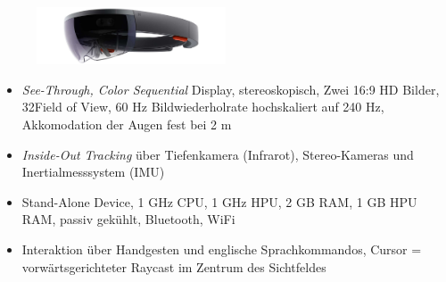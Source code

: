 \begin{frame}[fragile]{}
\begin{figure}[h!]
	\centering
	\includegraphics[width=0.5\textwidth]{images/papers/hololens.jpg}
\end{figure}
\begin{itemize}
	\pause
	\item \textit{See-Through, Color Sequential} Display, stereoskopisch, Zwei 16:9 HD Bilder, 32\degree Field of View, 60 Hz Bildwiederholrate hochskaliert auf 240 Hz, Akkomodation der Augen fest bei 2 m
	\pause
	\item \textit{Inside-Out Tracking} über Tiefenkamera (Infrarot), Stereo-Kameras und Inertialmesssystem (IMU)
	\pause
	\item Stand-Alone Device, 1 GHz CPU, 1 GHz HPU, 2 GB RAM, 1 GB HPU RAM, passiv gekühlt, Bluetooth, WiFi
	\pause
	\item Interaktion über Handgesten und englische Sprachkommandos, Cursor = vorwärtsgerichteter Raycast im Zentrum des Sichtfeldes
\end{itemize}	
\end{frame}

